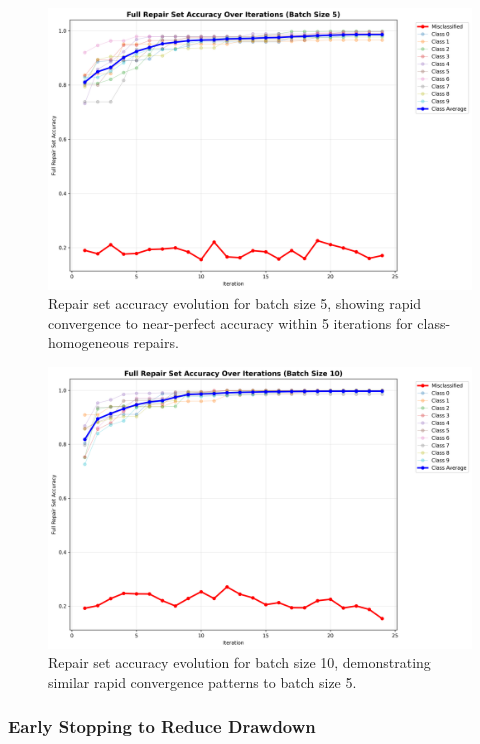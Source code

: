 \documentclass{article}
\begin{document}
\begin{figure}[h]
	\centering
	\includegraphics[width=\textwidth]{results/stochastic_analysis/batch_iterations/repair_accuracy_batch_5.png}
	\caption{Repair set accuracy evolution for batch size 5, showing rapid convergence to near-perfect accuracy within 5 iterations for class-homogeneous repairs.}
	\label{fig:repair_convergence_batch_5}
\end{figure}

\begin{figure}[h]
	\centering
	\includegraphics[width=\textwidth]{results/stochastic_analysis/batch_iterations/repair_accuracy_batch_10.png}
	\caption{Repair set accuracy evolution for batch size 10, demonstrating similar rapid convergence patterns to batch size 5.}
	\label{fig:repair_convergence_batch_10}
\end{figure}

\subsubsection{Early Stopping to Reduce Drawdown}
\end{document}
